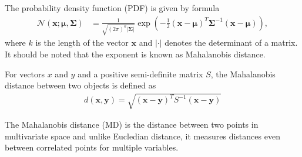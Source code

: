 The probability density function (PDF) is given by formula
\begin{align}
    \mathcal{N}(\mathbf{x};\mathbf{\mu},\mathbf{\Sigma}) &= \frac{1}{\sqrt{(2\pi)^k |\mathbf{\Sigma}|}}\exp(-\frac{1}{2}(\mathbf{x}-\mathbf{\mu})^T\mathbf{\Sigma}^{-1}(\mathbf{x}-\mathbf{\mu})),
\end{align}
where $k$ is the length of the vector $\mathbf{x}$ and $|\cdot|$ denotes the determinant of a matrix. It should be noted that the exponent is known as Mahalanobis distance.
\begin{definition}
    For vectors $x$ and $y$ and a positive semi-definite matrix $S$, the Mahalanobis distance between two objects is defined as
    \begin{align}
        d(\mathbf{x},\mathbf{y}) = \sqrt{(\mathbf{x}-\mathbf{y})^T S^{-1} (\mathbf{x}-\mathbf{y})}
    \end{align}
\end{definition}
The Mahalanobis distance (MD) is the distance between two points in multivariate space and unlike Eucledian distance, it measures distances even between correlated points for multiple variables.


